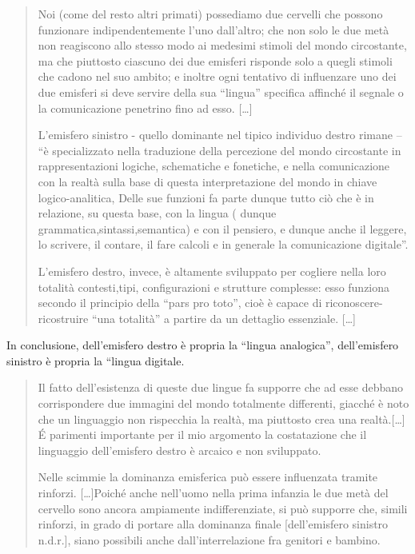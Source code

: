 \begin{quote}
Noi (come del resto altri primati) possediamo due cervelli che possono
funzionare  indipendentemente l’uno dall’altro; che non solo le due metà non
reagiscono  allo stesso modo ai medesimi stimoli  del mondo circostante, ma
che piuttosto ciascuno dei due emisferi  risponde solo a quegli
stimoli  che cadono nel suo ambito; e inoltre ogni tentativo  di influenzare uno
dei due emisferi  si deve servire della sua “lingua” specifica affinché il
segnale o la comunicazione penetrino fino ad esso. [\ldots]

L’emisfero sinistro - quello dominante nel tipico individuo destro rimane – “è
specializzato nella traduzione  della percezione del mondo circostante  in
rappresentazioni logiche, schematiche e fonetiche, e nella comunicazione  con la
realtà  sulla base di questa interpretazione del mondo in chiave logico-analitica,
Delle  sue funzioni fa parte dunque tutto ciò che è in relazione, su questa base,
con la lingua ( dunque grammatica,sintassi,semantica) e con il pensiero, e dunque
anche il leggere, lo scrivere, il contare, il fare calcoli e in generale la
comunicazione digitale”.

L’emisfero destro, invece, è altamente sviluppato per cogliere  nella loro
totalità contesti,tipi, configurazioni e strutture complesse: esso funziona
secondo il principio della “pars pro toto”, cioè  è capace di
riconoscere-ricostruire “una totalità” a partire da un dettaglio essenziale.
[\ldots]
\end{quote}

In  conclusione, dell’emisfero destro è propria la “lingua analogica”,
dell’emisfero sinistro  è propria la “lingua digitale.

\begin{quote}
Il fatto dell’esistenza di queste due lingue  fa supporre che ad esse debbano
corrispondere due immagini del mondo totalmente differenti, giacché è noto  che
un linguaggio non rispecchia la realtà, ma piuttosto crea una realtà.[\ldots] É
parimenti importante  per il mio argomento la costatazione che il linguaggio
dell’emisfero destro è arcaico e non sviluppato.

Nelle scimmie la dominanza emisferica  può essere influenzata tramite rinforzi.
[\ldots]Poiché anche nell’uomo nella prima infanzia le due metà del cervello sono
ancora ampiamente indifferenziate, si può supporre che, simili rinforzi, in
grado di portare alla dominanza finale [dell’emisfero sinistro n.d.r.], siano
possibili anche dall’interrelazione fra genitori e bambino.
\end{quote}


